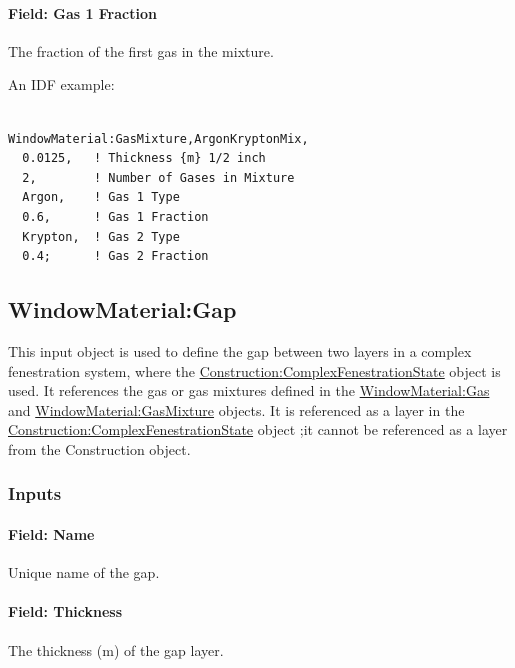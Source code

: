 \paragraph{Field: Gas 1 Fraction}\label{field-gas-1-fraction}

The fraction of the first gas in the mixture.

An IDF example:

\begin{lstlisting}

WindowMaterial:GasMixture,ArgonKryptonMix,
  0.0125,   ! Thickness {m} 1/2 inch
  2,        ! Number of Gases in Mixture
  Argon,    ! Gas 1 Type
  0.6,      ! Gas 1 Fraction
  Krypton,  ! Gas 2 Type
  0.4;      ! Gas 2 Fraction
\end{lstlisting}

\subsection{WindowMaterial:Gap}\label{windowmaterialgap}

This input object is used to define the gap between two layers in a complex fenestration system, where the \hyperref[constructioncomplexfenestrationstate]{Construction:ComplexFenestrationState} object is used. It references the gas or gas mixtures defined in the \hyperref[windowmaterialgas]{WindowMaterial:Gas} and \hyperref[windowmaterialgasmixture]{WindowMaterial:GasMixture} objects. It is referenced as a layer in the \hyperref[constructioncomplexfenestrationstate]{Construction:ComplexFenestrationState} object ;it cannot be referenced as a layer from the Construction object.

\subsubsection{Inputs}\label{inputs-18-009}

\paragraph{Field: Name}\label{field-name-12-011}

Unique name of the gap.

\paragraph{Field: Thickness}\label{field-thickness-5}

The thickness (m) of the gap layer.

